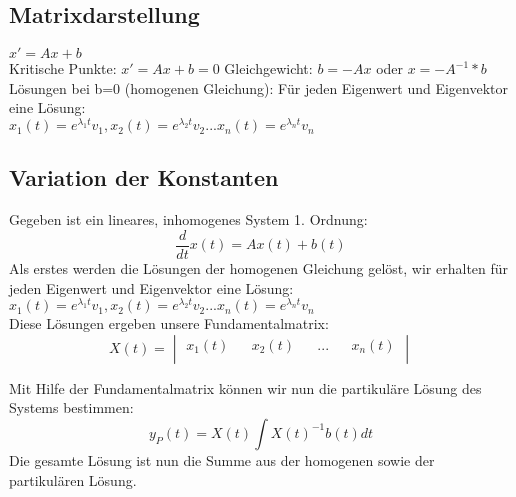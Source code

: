 \subsection{Matrixdarstellung}
$x' = Ax + b$\\
Kritische Punkte: $x' = Ax + b = 0$ Gleichgewicht: $b = -Ax$ oder $x = -A^{-1}*b$\\
Lösungen bei b=0 (homogenen Gleichung): Für jeden Eigenwert und Eigenvektor eine Lösung: \\
$x_1(t) = e^{\lambda_1t}v_1,x_2(t) = e^{\lambda_2t}v_2...x_n(t) = e^{\lambda_nt}v_n$\\

\subsection{Variation der Konstanten}
Gegeben ist ein lineares, inhomogenes System 1. Ordnung: \\
\begin{equation*}
\frac{d}{dt}x(t) = Ax(t) + b(t) 
\end{equation*}
Als erstes werden die Lösungen der homogenen Gleichung gelöst, wir erhalten für jeden Eigenwert und Eigenvektor eine Lösung: \\
$x_1(t) = e^{\lambda_1t}v_1,x_2(t) = e^{\lambda_2t}v_2...x_n(t) = e^{\lambda_nt}v_n$\\
Diese Lösungen ergeben unsere Fundamentalmatrix:\\
\begin{equation*}
X(t) = 
	\begin{vmatrix} 
	        x_1(t) && x_2(t) && ... && x_n(t)\\    
	\end{vmatrix}
\end{equation*}

Mit Hilfe der Fundamentalmatrix können wir nun die partikuläre Lösung des Systems bestimmen:\\
\begin{equation*}
y_P(t) = X(t) \int{X(t)^{-1}b(t)dt}
\end{equation*}
Die gesamte Lösung ist nun die Summe aus der homogenen sowie der partikulären Lösung.

\newpage
